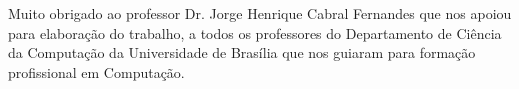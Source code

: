 Muito obrigado ao professor Dr. Jorge Henrique Cabral Fernandes que nos apoiou para elaboração do trabalho, a todos os professores do Departamento de Ciência da Computação da Universidade de Brasília que nos guiaram para formação profissional em Computação.